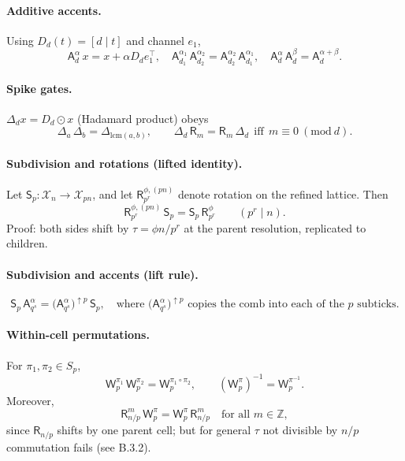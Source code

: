 \documentclass[12pt]{article}
\numberwithin{equation}{section}
\theoremstyle{plain}
\theoremstyle{definition}
\theoremstyle{remark}
\begin{document}
\paragraph{Additive accents.} Using $D_d(t)=[d\mid t]$ and channel $e_1$,
\[
\mathsf{A}_d^{\alpha}\,x=x+\alpha D_d e_1^\top,\quad
\mathsf{A}_{d_1}^{\alpha_1}\,\mathsf{A}_{d_2}^{\alpha_2}=\mathsf{A}_{d_2}^{\alpha_2}\,\mathsf{A}_{d_1}^{\alpha_1},\quad
\mathsf{A}_d^{\alpha}\,\mathsf{A}_d^{\beta}=\mathsf{A}_d^{\alpha+\beta}.
\]

\paragraph{Spike gates.} $\Delta_d x = D_d\odot x$ (Hadamard product) obeys
\[
\Delta_{a}\,\Delta_{b}=\Delta_{\mathrm{lcm}(a,b)},\qquad
\Delta_d\,\mathsf{R}_m=\mathsf{R}_m\,\Delta_d\ \ \text{iff}\ \ m\equiv 0\ (\mathrm{mod}\ d).
\]

\paragraph{Subdivision and rotations (lifted identity).}
Let $\mathsf{S}_p:\mathcal{X}_n\to\mathcal{X}_{pn}$, and let $\mathsf{R}_{p^r}^{\phi,(pn)}$ denote rotation on the refined lattice. Then
\[
\mathsf{R}_{p^r}^{\phi,(pn)}\,\mathsf{S}_p = \mathsf{S}_p\,\mathsf{R}_{p^r}^{\phi}\qquad (p^r\mid n).
\]
Proof: both sides shift by $\tau=\phi n/p^r$ at the parent resolution, replicated to children.

\paragraph{Subdivision and accents (lift rule).}
\[
\mathsf{S}_p\,\mathsf{A}_{q^s}^{\alpha}=
\big(\mathsf{A}_{q^s}^{\alpha}\big)^{\uparrow p}\,\mathsf{S}_p,\quad
\text{where } \big(\mathsf{A}_{q^s}^{\alpha}\big)^{\uparrow p} \text{ copies the comb into each of the } p \text{ subticks.}
\]

\paragraph{Within-cell permutations.}
For $\pi_1,\pi_2\in S_p$,
\[
\mathsf{W}_p^{\pi_1}\,\mathsf{W}_p^{\pi_2}=\mathsf{W}_p^{\pi_1\circ \pi_2},\qquad (\mathsf{W}_p^{\pi})^{-1}=\mathsf{W}_p^{\pi^{-1}}.
\]
Moreover,
\[
\mathsf{R}_{n/p}^{m}\,\mathsf{W}_p^{\pi}=\mathsf{W}_p^{\pi}\,\mathsf{R}_{n/p}^{m}\quad\text{for all } m\in\mathbb{Z},
\]
since $\mathsf{R}_{n/p}$ shifts by one parent cell; but for general $\tau$ not divisible by $n/p$ commutation fails (see B.3.2).
\end{document}
